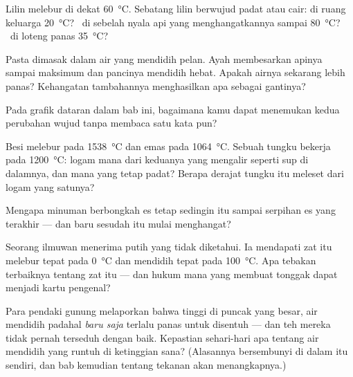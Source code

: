 \begin{exercise}[$\star$]\label{exo:g4:changes-of-state:5}
Lilin melebur di dekat \qty{60}{\celsius}. Sebatang lilin berwujud
padat atau cair: di ruang keluarga \qty{20}{\celsius}? \ di sebelah
nyala api yang menghangatkannya sampai \qty{80}{\celsius}? \ di loteng
 panas \qty{35}{\celsius}?
\end{exercise}

\begin{exercise}[$\star$]\label{exo:g4:changes-of-state:6}
Pasta dimasak dalam air yang mendidih pelan. Ayah membesarkan apinya
sampai maksimum dan pancinya mendidih hebat. Apakah airnya sekarang
lebih panas? Kehangatan tambahannya menghasilkan apa sebagai gantinya?
\end{exercise}

\begin{exercise}[$\star$]\label{exo:g4:changes-of-state:7}
Pada grafik dataran dalam bab ini, bagaimana kamu dapat menemukan
kedua perubahan wujud tanpa membaca satu kata pun?
\end{exercise}

\begin{exercise}[$\star$]\label{exo:g4:changes-of-state:8}
Besi melebur pada \qty{1538}{\celsius} dan emas pada
\qty{1064}{\celsius}. Sebuah tungku bekerja pada \qty{1200}{\celsius}:
logam mana dari keduanya yang mengalir seperti sup di dalamnya, dan
mana yang tetap padat? Berapa derajat tungku itu meleset dari logam
yang satunya?
\end{exercise}

\begin{exercise}[$\star$]\label{exo:g4:changes-of-state:9}
Mengapa minuman berbongkah es tetap sedingin itu sampai serpihan es
yang terakhir --- dan baru sesudah itu mulai menghangat?
\end{exercise}

\begin{exercise}[$\star\star$]\label{exo:g4:changes-of-state:10}
Seorang ilmuwan menerima  putih yang tidak diketahui. Ia
mendapati zat itu melebur tepat pada \qty{0}{\celsius} dan 
mendidih tepat pada \qty{100}{\celsius}. Apa tebakan terbaiknya
tentang zat itu --- dan hukum mana yang membuat tonggak dapat menjadi
kartu pengenal?
\end{exercise}

\begin{exercise}[$\star\star$]\label{exo:g4:changes-of-state:11}
Para pendaki gunung melaporkan bahwa tinggi di puncak yang besar, air
mendidih padahal \emph{baru saja} terlalu panas untuk disentuh --- dan
teh mereka tidak pernah terseduh dengan baik. Kepastian sehari-hari
apa tentang air mendidih yang runtuh di ketinggian sana? (Alasannya
bersembunyi di dalam  itu sendiri, dan bab kemudian tentang
tekanan  akan menangkapnya.)
\end{exercise}
